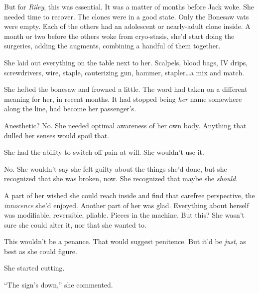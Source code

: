 But for \emph{Riley}, this was essential.  It was a matter of months before Jack woke.  She needed time to recover.  The clones were in a good state.  Only the Bonesaw vats were empty.  Each of the others had an adolescent or nearly-adult clone inside.  A month or two before the others woke from cryo-stasis, she'd start doing the surgeries, adding the augments, combining a handful of them together.



She laid out everything on the table next to her.  Scalpels, blood bags, IV drips, screwdrivers, wire, staple, cauterizing gun, hammer, stapler\ldots a mix and match.



She hefted the bonesaw and frowned a little.  The word had taken on a different meaning for her, in recent months.  It had stopped being \emph{her} name somewhere along the line, had become her passenger's.



Anesthetic?  No.  She needed optimal awareness of her own body.  Anything that dulled her senses would spoil that.



She had the ability to switch off pain at will.  She wouldn't use it.



No.  She wouldn't say she felt guilty about the things she'd done, but she recognized that she was broken, now.  She recognized that maybe she \emph{should}.



A part of her wished she could reach inside and find that carefree perspective, the \emph{innocence} she'd enjoyed.  Another part of her was glad.  Everything about herself was modifiable, reversible, pliable.  Pieces in the machine.  But this?  She wasn't sure she could alter it, nor that she wanted to.



This wouldn't be a penance.  That would suggest penitence.  But it'd be \emph{just}, as best as she could figure.



She started cutting.



\sectionbreak






``The sign's down,'' she commented.



